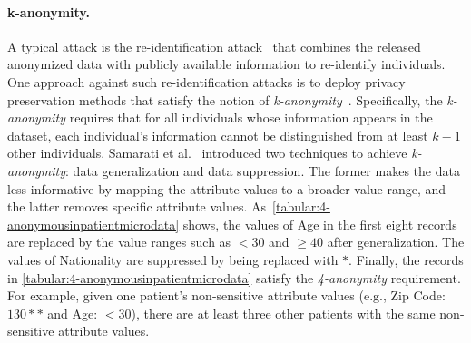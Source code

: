 \paragraph{k-anonymity.}
A typical attack is the re-identification attack~\cite{sweeney1997weaving} that combines the released anonymized data with publicly available information to re-identify individuals. One approach against such re-identification attacks is to deploy privacy preservation methods that satisfy the notion of \textit{k-anonymity}~\cite{samarati1998protecting}. Specifically, the \textit{k-anonymity} requires that for all individuals whose information appears in the dataset, each individual's information cannot be distinguished from at least $k-1$ other individuals.
Samarati et al.~\cite{samarati1998protecting} introduced two techniques to achieve \textit{k-anonymity}: data generalization and data suppression. The former makes the data less informative by mapping the attribute values to a broader value range, and the latter removes specific attribute values. As~\autoref{tabular:4-anonymousinpatientmicrodata} shows, the values of Age in the first eight records are replaced by the value ranges such as $<30$ and $\geq 40$ after generalization. The values of Nationality are suppressed by being replaced with $*$. Finally, the records in \autoref{tabular:4-anonymousinpatientmicrodata} satisfy the \textit{4-anonymity} requirement. For example, given one patient's non-sensitive attribute values (e.g., Zip Code: $130**$ and Age: $<30$), there are at least three other patients with the same non-sensitive attribute values.



